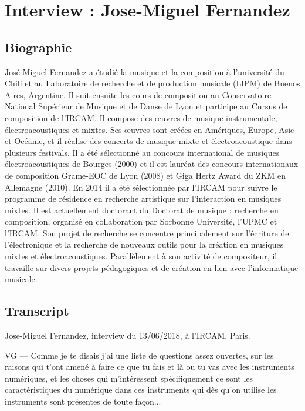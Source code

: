 \chapter{Interview : Jose-Miguel Fernandez}
\label{appendix:fernandez}

\section*{Biographie}

\noindent José Miguel Fernandez a étudié la musique et la composition à l’université du Chili et au Laboratoire de recherche et de production musicale (LIPM) de Buenos Aires, Argentine. Il suit ensuite les cours de composition au Conservatoire National Supérieur de Musique et de Danse de Lyon et participe au Cursus de composition de l’IRCAM. Il compose des œuvres de musique instrumentale, électroacoustiques et mixtes. Ses œuvres sont créées en Amériques, Europe, Asie et Océanie, et il réalise des concerts de musique mixte et électroacoustique dans plusieurs festivals. Il a été sélectionné au concours international de musiques électroacoustiques de Bourges (2000) et il est lauréat des concours internationaux de composition Grame-EOC de Lyon (2008) et Giga Hertz Award du ZKM en Allemagne (2010). En 2014 il a été sélectionnée par l'IRCAM pour suivre le programme de résidence en recherche artistique sur l'interaction en musiques mixtes. Il est actuellement doctorant du Doctorat de musique : recherche en composition, organisé en collaboration par Sorbonne Université, l’UPMC et l'IRCAM. Son projet de recherche se concentre principalement sur l’écriture de l’électronique et la recherche de nouveaux outils pour la création en musiques mixtes et électroacoustiques. Parallèlement à son activité de compositeur, il travaille sur divers projets pédagogiques et de création en lien avec l’informatique musicale.

\section*{Transcript}

\noindent Jose-Miguel Fernandez, interview du 13/06/2018, à l'IRCAM, Paris.

VG — Comme je te disais j'ai une liste de questions assez ouvertes, sur les raisons qui t'ont amené à faire ce que tu fais et là ou tu vas avec les instruments numériques, et les choses qui m'intéressent spécifiquement ce sont les caractéristiques du numérique dans ces instruments qui dès qu'on utilise les instruments sont présentes de toute façon... 

